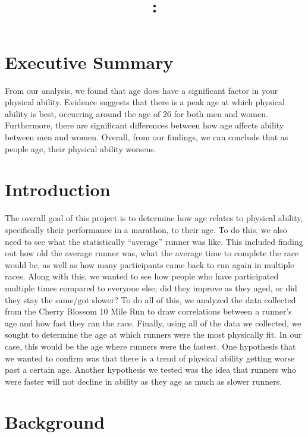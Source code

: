 \documentclass[12pt]{article}
\title{\large
	\ASSIGNMENTNAME
	\\~\\
	\COURSENUMB:
	\\
	\COURSENAME
}
\author{\MYNAME}
\date{\SUBMISSIONDATE}
\begin{document}
\maketitle


\section*{Executive Summary}

From our analysis, we found that age does have a significant factor in your
physical ability. Evidence suggests that there is a peak age at which physical
ability is best, occurring around the age of 26 for both men and women.
Furthermore, there are significant differences between how age affects ability
between men and women. Overall, from our findings, we can conclude that as
people age, their physical ability worsens.


\section*{Introduction}

The overall goal of this project is to determine how age relates to physical
ability, specifically their performance in a marathon, to their age. To do this,
we also need to see what the statistically “average” runner was like.
This included finding out how old the average runner was, what the average time
to complete the race would be, as well as how many participants came back to run
again in multiple races.
Along with this, we wanted to see how people who have participated multiple
times compared to everyone else; did they improve as they aged, or did they
stay the same/got slower? To do all of this, we analyzed the data collected
from the Cherry Blossom 10 Mile Run to draw correlations between a runner's
age and how fast they ran the race.
Finally, using all of the data we collected, we sought to determine the age at
which runners were the most physically fit.
In our case, this would be the age where runners were the fastest.
One hypothesis that we wanted to confirm was that there is a trend of physical
ability getting worse past a certain age.
Another hypothesis we tested was the idea that runners who were faster will
not decline in ability as they age as much as slower runners.

\section*{Background}
\end{document}
